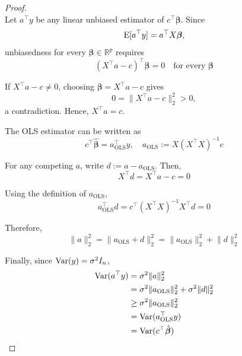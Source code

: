 \begin{proof}\leavevmode\\
    Let $a^\top y$ be any linear unbiased estimator of $c^\top\bm\beta$. Since
    \begin{equation*}
        \operatorname{E}[a^\top y] = a^\top X\bm\beta,
    \end{equation*}
    unbiasedness for every $\bm\beta \in \mathbb{R}^p$ requires
    \begin{equation*}
        (X^\top a - c)^\top \bm\beta = 0 \quad \text{for every } \bm\beta
    \end{equation*}

    If $X^\top a - c \neq 0$, choosing $\bm\beta = X^\top a - c$ gives
    \begin{equation*}
        0 = \lVert X^\top a - c \rVert_2^2 > 0,
    \end{equation*}
    a contradiction. Hence, $X^\top a = c$.

    The OLS estimator can be written as
    \begin{equation*}
        c^\top\hat{\bm\beta} = a_{\text{OLS}}^\top y, \quad a_{\text{OLS}} := X(X^\top X)^{-1}c
    \end{equation*}

    For any competing $a$, write $d := a - a_{\text{OLS}}$. Then,
    \begin{equation*}
        X^\top d = X^\top a - c = 0
    \end{equation*}

    Using the definition of $a_{\text{OLS}}$,
    \begin{equation*}
        a_{\text{OLS}}^\top d = c^\top(X^\top X)^{-1}X^\top d = 0
    \end{equation*}

    Therefore,
    \begin{equation*}
        \lVert a \rVert_2^2 = \lVert a_{\text{OLS}} + d \rVert_2^2 = \lVert a_{\text{OLS}} \rVert_2^2 + \lVert d \rVert_2^2
    \end{equation*}

    Finally, since $\operatorname{Var}(y) = \sigma^2 I_n$,
    \begin{align*}
        \operatorname{Var}(a^\top y) &= \sigma^2\lVert a \rVert_2^2 \\
        &= \sigma^2\lVert a_{\text{OLS}} \rVert_2^2 + \sigma^2\lVert d \rVert_2^2 \\
        &\geq \sigma^2\lVert a_{\text{OLS}} \rVert_2^2 \\
        &= \operatorname{Var}(a_{\text{OLS}}^\top y) \\
        &= \operatorname{Var}(c^\top\hat{\bm\beta})
    \end{align*}
\end{proof}


